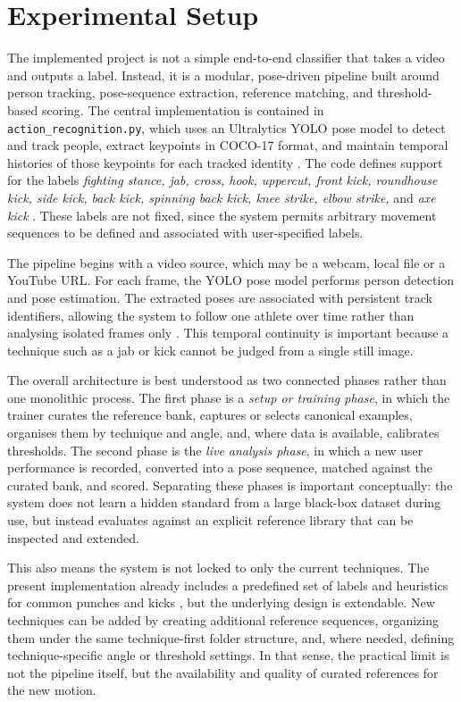 \documentclass[12pt]{article}
\begin{document}
\section{Experimental Setup}
The implemented project is not a simple end-to-end classifier that takes a video and outputs a label. Instead, it is a modular, pose-driven pipeline built around person tracking, pose-sequence extraction, reference matching, and threshold-based scoring. The central implementation is contained in \texttt{action\_recognition.py}, which uses an Ultralytics YOLO pose model to detect and track people, extract keypoints in COCO-17 format, and maintain temporal histories of those keypoints for each tracked identity \cite{projectActionRecognition}. The code defines support for the labels \textit{fighting stance, jab, cross, hook, uppercut, front kick, roundhouse kick, side kick, back kick, spinning back kick, knee strike, elbow strike,} and \textit{axe kick} \cite{projectActionRecognition}. These labels are not fixed, since the system permits arbitrary movement sequences to be defined and associated with user-specified labels.


The pipeline begins with a video source, which may be a webcam, local file or a YouTube URL. For each frame, the YOLO pose model performs person detection and pose estimation. The extracted poses are associated with persistent track identifiers, allowing the system to follow one athlete over time rather than analysing isolated frames only \cite{projectActionRecognition}. This temporal continuity is important because a technique such as a jab or kick cannot be judged from a single still image.

The overall architecture is best understood as two connected phases rather than one monolithic process. The first phase is a \emph{setup or training phase}, in which the trainer curates the reference bank, captures or selects canonical examples, organises them by technique and angle, and, where data is available, calibrates thresholds. The second phase is the \emph{live analysis phase}, in which a new user performance is recorded, converted into a pose sequence, matched against the curated bank, and scored. Separating these phases is important conceptually: the system does not learn a hidden standard from a large black-box dataset during use, but instead evaluates against an explicit reference library that can be inspected and extended.

This also means the system is not locked to only the current techniques. The present implementation already includes a predefined set of labels and heuristics for common punches and kicks \cite{projectActionRecognition}, but the underlying design is extendable. New techniques can be added by creating additional reference sequences, organizing them under the same technique-first folder structure, and, where needed, defining technique-specific angle or threshold settings. In that sense, the practical limit is not the pipeline itself, but the availability and quality of curated references for the new motion.
\end{document}
